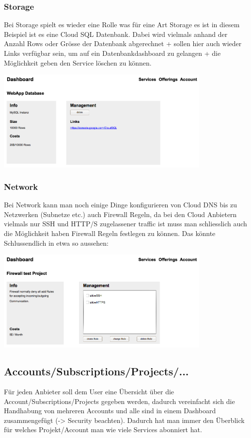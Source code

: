 \documentclass[11pt]{scrartcl}
\begin{document}
\subsubsection{Storage}
Bei Storage spielt es wieder eine Rolle was für eine Art Storage es ist in 
diesem Beispiel ist es eine Cloud SQL Datenbank.
Dabei wird vielmals anhand der Anzahl Rows oder Grösse der Datenbank abgerechnet 
+ sollen hier auch wieder Links verfügbar sein, um auf ein Datenbankdashboard zu 
gelangen + die Möglichkeit geben den Service löschen zu können.

\includegraphics[width=0.8\textwidth]{service_info_storage}


\subsubsection{Network}
Bei Network kann man noch einige Dinge konfigurieren von Cloud DNS bis zu 
Netzwerken (Subnetze etc.) auch Firewall Regeln, da bei den Cloud Anbietern 
vielmals nur SSH und HTTP/S zugelassener traffic ist muss man schliesslich auch 
die Möglichkeit haben Firewall Regeln festlegen zu können.
Das könnte Schlussendlich in etwa so aussehen:


\includegraphics[width=0.8\textwidth]{service_info_network}


\subsection{Accounts/Subscriptions/Projects/...}
Für jeden Anbieter soll dem User eine Übersicht über die 
Account/Subscriptions/Projects gegeben werden, dadurch vereinfacht sich die 
Handhabung von mehreren Accounts und alle sind in einem Dashboard zusammengefügt 
(-> Security beachten).
Dadurch hat man immer den Überblick für welches Projekt/Account man wie viele 
Services abonniert hat.
\end{document}
